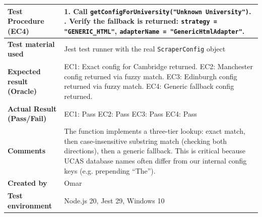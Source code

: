 \begin{table}[h!]
\begin{tabular}{|p{}|p{}|}
\textbf{Test Procedure (EC4)} & 1. Call \texttt{getConfigForUniversity("Unknown University")}. \newline 2. Verify the fallback is returned: \texttt{strategy = "GENERIC\_HTML"}, \texttt{adapterName = "GenericHtmlAdapter"}. \\ \hline
\textbf{Test material used} & Jest test runner with the real \texttt{ScraperConfig} object \\ \hline
\textbf{Expected result (Oracle)} & EC1: Exact config for Cambridge returned. \newline EC2: Manchester config returned via fuzzy match. \newline EC3: Edinburgh config returned via fuzzy match. \newline EC4: Generic fallback config returned. \\ \hline
\textbf{Actual Result (Pass/Fail)} & EC1: Pass \newline EC2: Pass \newline EC3: Pass \newline EC4: Pass \\ \hline
\textbf{Comments} & The function implements a three-tier lookup: exact match, then case-insensitive substring match (checking both directions), then a generic fallback. This is critical because UCAS database names often differ from our internal config keys (e.g. prepending ``The''). \\ \hline
\textbf{Created by} & Omar \\ \hline
\textbf{Test environment} & Node.js 20, Jest 29, Windows 10 \\ \hline
\end{tabular}
\end{table}

